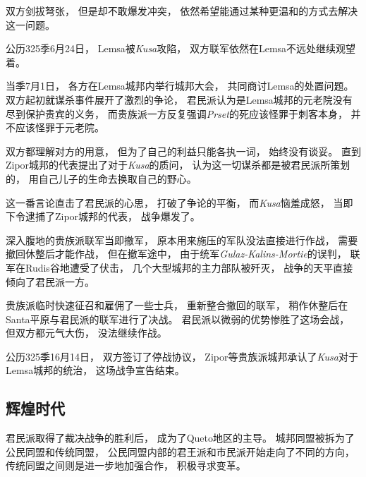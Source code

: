 \documentclass[UTF8,12pt,draft]{ctexbook}
\begin{document}
                双方剑拔弩张，
                但是却不敢爆发冲突，
                依然希望能通过某种更温和的方式去解决这一问题。

                公历325季6月24日，
                Lemsa被\emph{Kusa}攻陷，
                双方联军依然在Lemsa不远处继续观望着。

                当季7月1日，
                各方在Lemsa城邦内举行城邦大会，
                共同商讨Lemsa的处置问题。
                双方起初就谋杀事件展开了激烈的争论，
                君民派认为是Lemsa城邦的元老院没有尽到保护贵宾的义务，
                而贵族派一方反复强调\emph{Prset}的死应该怪罪于刺客本身，
                并不应该怪罪于元老院。

                双方都理解对方的用意，
                但为了自己的利益只能各执一词，
                始终没有谈妥。
                直到Zipor城邦的代表提出了对于\emph{Kusa}的质问，
                认为这一切谋杀都是被君民派所策划的，
                用自己儿子的生命去换取自己的野心。

                这一番言论直击了君民派的心思，
                打破了争论的平衡，
                而\emph{Kusa}恼羞成怒，
                当即下令逮捕了Zipor城邦的代表，
                战争爆发了。

                深入腹地的贵族派联军当即撤军，
                原本用来施压的军队没法直接进行作战，
                需要撤回休整后才能作战，
                但在撤军途中，
                由于统军\emph{Gulaz-Kalins-Mortie}的误判，
                联军在Rudis谷地遭受了伏击，
                几个大型城邦的主力部队被歼灭，
                战争的天平直接倾向了君民派一方。

                贵族派临时快速征召和雇佣了一些士兵，
                重新整合撤回的联军，
                稍作休整后在Santa平原与君民派的联军进行了决战。
                君民派以微弱的优势惨胜了这场会战，
                但双方都元气大伤，
                没法继续作战。

                公历325季16月14日，
                双方签订了停战协议，
                Zipor等贵族派城邦承认了\emph{Kusa}对于Lemsa城邦的统治，
                这场战争宣告结束。
            \subsection{辉煌时代}
                君民派取得了裁决战争的胜利后，
                成为了Queto地区的主导。
                城邦同盟被拆为了公民同盟和传统同盟，
                公民同盟内部的君王派和市民派开始走向了不同的方向，
                传统同盟之间则是进一步地加强合作，
                积极寻求变革。
\end{document}
